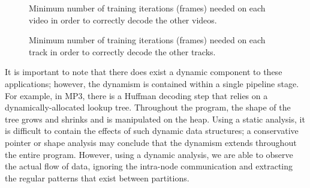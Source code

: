 \begin{figure}[t]
\begin{minipage}{3.075in}
\vspace{-12pt}
\caption[Training needed for correct parallelization of
  MPEG-2.]{Minimum number of training iterations (frames) needed on
  each video in order to correctly decode the other videos.
  \protect\label{tab:mpeg2-matrix}}
\end{minipage}
\hspace{0.3in}
\begin{minipage}{3.02in}
\vspace{-12pt}
\caption[Training needed for correct parallelization of MP3.]{Minimum
  number of training iterations (frames) needed on each track in order
  to correctly decode the other tracks.
  \protect\label{tab:mp3-matrix}}
\end{minipage}
\end{figure}

It is important to note that there does exist a dynamic component to
these applications; however, the dynamism is contained within a single
pipeline stage.  For example, in MP3, there is a Huffman decoding step
that relies on a dynamically-allocated lookup tree.  Throughout the
program, the shape of the tree grows and shrinks and is manipulated on
the heap.  Using a static analysis, it is difficult to contain the
effects of such dynamic data structures; a conservative pointer or
shape analysis may conclude that the dynamism extends throughout the
entire program.  However, using a dynamic analysis, we are able to
observe the actual flow of data, ignoring the intra-node communication
and extracting the regular patterns that exist between partitions.



